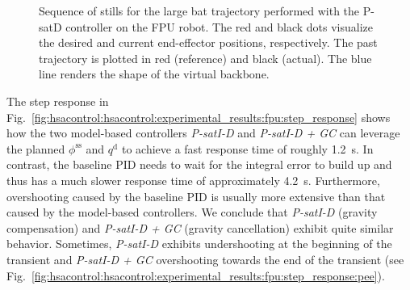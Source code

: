 \begin{figure}[hb]
    \caption{Sequence of stills for the large bat trajectory performed with the P-satD controller on the FPU robot. The red and black dots visualize the desired and current end-effector positions, respectively. The past trajectory is plotted in red (reference) and black (actual). The blue line renders the shape of the virtual backbone.
    }\label{fig:hsacontrol:hsacontrol:experimental_results:fpu:sequence_of_stills:bat}
\end{figure}

The step response in Fig.~\ref{fig:hsacontrol:hsacontrol:experimental_results:fpu:step_response} shows how the two model-based controllers \emph{P-satI-D} and \emph{P-satI-D + GC} can leverage the planned $\phi^\mathrm{ss}$ and $q^\mathrm{d}$ to achieve a fast response time of roughly \SI{1.2}{s}. In contrast, the baseline PID needs to wait for the integral error to build up and thus has a much slower response time of approximately \SI{4.2}{s}. Furthermore, overshooting caused by the baseline PID is usually more extensive than that caused by the model-based controllers.
We conclude that \emph{P-satI-D} (gravity compensation) and \emph{P-satI-D + GC} (gravity cancellation) exhibit quite similar behavior. Sometimes, \emph{P-satI-D} exhibits undershooting at the beginning of the transient and \emph{P-satI-D + GC} overshooting towards the end of the transient (see Fig.~\ref{fig:hsacontrol:hsacontrol:experimental_results:fpu:step_response:pee}).


